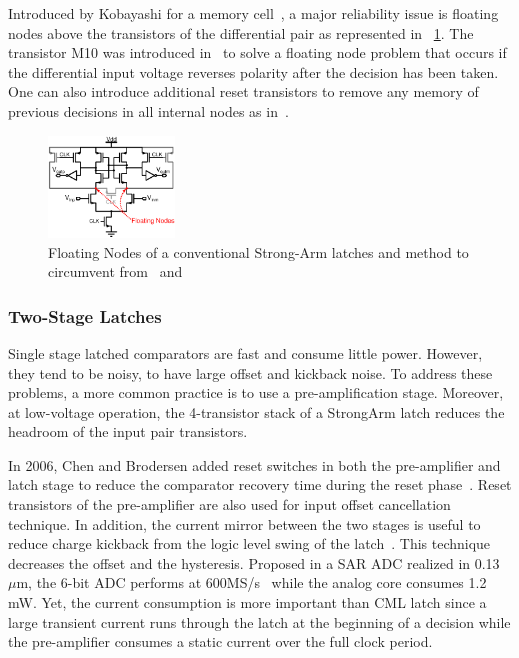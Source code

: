Introduced by Kobayashi for a memory cell~\cite{Kobayashi1993}, a major reliability issue is floating nodes above the transistors of the differential pair as represented in \figurename~\ref{fig:sa-fn}. The transistor M10 was introduced in~\cite{Montanaro1996} to solve a floating node problem that occurs if the differential input voltage reverses polarity after the decision has been taken. One can also introduce additional reset transistors to remove any memory of previous decisions in all internal nodes as in~\cite{Verbruggen2008}.

\begin{figure}[htp]
    \centering
    \includegraphics[width=0.3\textwidth]{Chapter7/Figs/StrongArm-FloatingNodes.ps}
    \caption{Floating Nodes of a conventional Strong-Arm latches and method to circumvent from~\cite{Montanaro1996} and~\cite{Verbruggen2008}}
    \label{fig:sa-fn}
\end{figure}

\subsubsection{Two-Stage Latches}
Single stage latched comparators are fast and consume little power. However, they tend to be noisy, to have large offset and kickback noise. To address these problems, a more common practice is to use a pre-amplification stage.
Moreover, at low-voltage operation, the 4-transistor stack of a StrongArm latch reduces the headroom of the input pair transistors.

In 2006, Chen and Brodersen added reset switches in both the pre-amplifier and latch stage to reduce the comparator recovery time during the reset phase~\cite{Brodersen2006}. Reset transistors of the pre-amplifier are also used for input offset cancellation technique. In addition, the current mirror between the two stages is useful to reduce charge kickback from the logic level swing of the latch~\cite{Bult1997}. This technique decreases the offset and the hysteresis. Proposed in a SAR ADC realized in 0.13 \(\mu\)m, the 6-bit ADC performs at 600MS/s~\cite{Brodersen2006} while the analog core consumes 1.2 mW. Yet, the current consumption is more important than CML latch since a large transient current runs through the latch at the beginning of a decision while the pre-amplifier consumes a static current over the full clock period.

